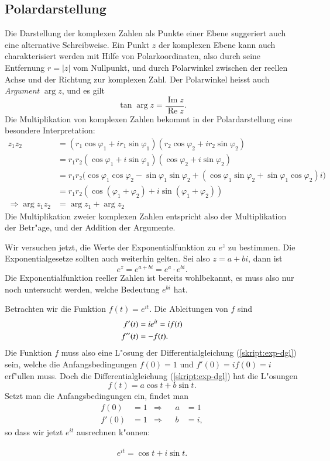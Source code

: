 \subsection{Polardarstellung}
Die Darstellung der komplexen Zahlen als Punkte einer Ebene suggeriert
auch eine alternative Schreibweise.
Ein Punkt $z$ der komplexen Ebene kann auch charakterisiert werden mit Hilfe von
Polarkoordinaten, also durch seine Entfernung $r=|z|$ vom Nullpunkt,
und durch Polarwinkel zwischen der reellen Achse und der Richtung
zur komplexen Zahl. Der Polarwinkel heisst auch {\em Argument} $\operatorname{arg}z$,
%
und es gilt
\[
\tan\operatorname{arg}z=\frac{\operatorname{Im}z}{\operatorname{Re}z}.
\]
Die Multiplikation von komplexen Zahlen bekommt in der Polardarstellung
eine besondere Interpretation:
\begin{align*}
z_1z_2
&=
(r_1\cos\varphi_1+ir_1\sin\varphi_1) (r_2\cos\varphi_2+ir_2\sin\varphi_2)
\\
&=
r_1r_2(\cos\varphi_1+i\sin\varphi_1) (\cos\varphi_2+i\sin\varphi_2)
\\
&=
r_1r_2\bigl(
\cos\varphi_1\cos\varphi_2-\sin\varphi_1\sin\varphi_2 +
(\cos\varphi_1\sin\varphi_2+\sin\varphi_1\cos\varphi_2)i\bigr)
\\
&=
r_1r_2(\cos(\varphi_1+\varphi_2)+i\sin(\varphi_1+\varphi_2))
\\
\Rightarrow \operatorname{arg}z_1z_2&=\arg z_1 + \arg z_2
\end{align*}
Die Multiplikation zweier komplexen Zahlen entspricht also der
Multiplikation der Betr"age, und der Addition der Argumente.

Wir versuchen jetzt, die Werte der Exponentialfunktion zu $e^z$ zu
bestimmen.
Die Exponentialgesetze sollten auch weiterhin gelten.
Sei also $z=a+bi$, dann ist
\[
e^z=e^{a+bi}=e^a\cdot e^{bi}.
\]
Die Exponentialfunktion reeller Zahlen ist bereits wohlbekannt, es muss
also nur noch untersucht werden, welche Bedeutung $e^{bi}$ hat.

Betrachten wir die Funktion $f(t)= e^{it}$. Die Ableitungen von $f$ sind
\begin{align}
f'(t)&=ie^{it}=if(t)\notag\\
f''(t)&=-f(t).\label{skript:exp-dgl}
\end{align}
Die Funktion $f$ muss also eine L"osung der Differentialgleichung
(\ref{skript:exp-dgl}) sein, welche die Anfangsbedingungen $f(0)=1$ und
$f'(0)=if(0)=i$ erf"ullen muss.
Doch die Differentialgleichung (\ref{skript:exp-dgl}) hat die L"osungen
\[
f(t)=a\cos t+b\sin t.
\]
Setzt man die Anfangsbedingungen ein, findet man
\begin{align*}
f(0)&=1&\Rightarrow&&a&=1\\
f'(0)&=1&\Rightarrow&&b&=i,
\end{align*}
so dass wir jetzt $e^{it}$ ausrechnen k"onnen:
\begin{satz}[Euler]
\begin{align}
e^{it}=\cos t+i\sin t.
\label{skript:euler-formula}
\end{align}
\end{satz}
%

